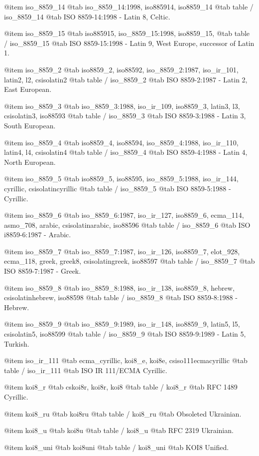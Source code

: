@item
iso_8859_14
@tab
iso_8859_14:1998, iso885914, iso8859_14
@tab
table / iso_8859_14
@tab
ISO 8859-14:1998 - Latin 8, Celtic.


@item
iso_8859_15
@tab
iso885915, iso_8859_15:1998, iso8859_15, 
@tab
table / iso_8859_15
@tab
ISO 8859-15:1998 - Latin 9, West Europe, successor of Latin 1.


@item
iso_8859_2
@tab
iso8859_2, iso88592, iso_8859_2:1987, iso_ir_101, latin2, l2, csisolatin2
@tab
table / iso_8859_2
@tab
ISO 8859-2:1987 - Latin 2, East European.


@item
iso_8859_3
@tab
iso_8859_3:1988, iso_ir_109, iso8859_3, latin3, l3, csisolatin3, iso88593
@tab
table / iso_8859_3
@tab
ISO 8859-3:1988 - Latin 3, South European.


@item
iso_8859_4
@tab
iso8859_4, iso88594, iso_8859_4:1988, iso_ir_110, latin4, l4, csisolatin4
@tab
table / iso_8859_4
@tab
ISO 8859-4:1988 - Latin 4, North European.


@item
iso_8859_5
@tab
iso8859_5, iso88595, iso_8859_5:1988, iso_ir_144, cyrillic, csisolatincyrillic
@tab
table / iso_8859_5
@tab
ISO 8859-5:1988 - Cyrillic.


@item
iso_8859_6
@tab
iso_8859_6:1987, iso_ir_127, iso8859_6, ecma_114, asmo_708, arabic, csisolatinarabic, iso88596
@tab
table / iso_8859_6
@tab
ISO i8859-6:1987 - Arabic.


@item
iso_8859_7
@tab
iso_8859_7:1987, iso_ir_126, iso8859_7, elot_928, ecma_118, greek, greek8, csisolatingreek, iso88597
@tab
table / iso_8859_7
@tab
ISO 8859-7:1987 - Greek.


@item
iso_8859_8
@tab
iso_8859_8:1988, iso_ir_138, iso8859_8, hebrew, csisolatinhebrew, iso88598
@tab
table / iso_8859_8
@tab
ISO 8859-8:1988 - Hebrew.


@item
iso_8859_9
@tab
iso_8859_9:1989, iso_ir_148, iso8859_9, latin5, l5, csisolatin5, iso88599
@tab
table / iso_8859_9
@tab
ISO 8859-9:1989 - Latin 5, Turkish.


@item
iso_ir_111
@tab
ecma_cyrillic, koi8_e, koi8e, csiso111ecmacyrillic
@tab
table / iso_ir_111
@tab
ISO IR 111/ECMA Cyrillic.


@item
koi8_r
@tab
cskoi8r, koi8r, koi8
@tab
table / koi8_r
@tab
RFC 1489 Cyrillic.


@item
koi8_ru
@tab
koi8ru
@tab
table / koi8_ru
@tab
Obsoleted Ukrainian.


@item
koi8_u
@tab
koi8u
@tab
table / koi8_u
@tab
RFC 2319 Ukrainian.


@item
koi8_uni
@tab
koi8uni
@tab
table / koi8_uni
@tab
KOI8 Unified.


